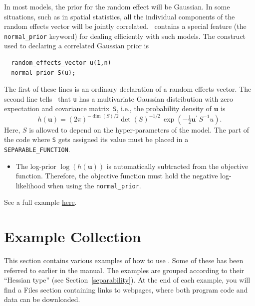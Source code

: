 \documentclass{admbmanual}
\begin{document}
In most models, the prior for the random effect will be Gaussian. In some
situations, such as in spatial statistics, all the individual components of the
random effects vector will be jointly correlated. \scAB\ contains a special
feature (the \texttt{normal\_prior} keyword) for dealing efficiently with such
models. The construct used to declaring a correlated Gaussian prior is
\begin{lstlisting}
  random_effects_vector u(1,n)
  normal_prior S(u);
\end{lstlisting}
The first of these lines is an ordinary declaration of a random effects vector.
The second line tells \scAB\ that \texttt{u} has a multivariate Gaussian
distribution with zero expectation and covariance matrix~\texttt{S}, i.e., the
probability density of $\mathbf{u}$ is
\[
h(\mathbf{u})=\left(2\pi \right)^{-\dim(S)/2}\det (S)^{-1/2}\,
\exp \left(-\tfrac{1}{2}\mathbf{u}^{\prime} \, S^{-1}u\right) .
\]
Here, $S$ is allowed to depend on the hyper-parameters of the model. The part of
the code where \texttt{S} gets assigned its value must be placed in a
\texttt{SEPARABLE\_FUNCTION}.
\begin{itemize}
  \item[$\bigstar$] The log-prior $\log \left(h\left(\mathbf{u}\right) \right)
  $ is automatically subtracted from the objective function. Therefore, the
  objective function must hold the negative log-likelihood when using the
  \texttt{normal\_prior}.
\end{itemize}
See a full example
\href{http://www.admb-project.org/otter-research/admbre/examples/spatial/spatial.html}{here}.

\appendix

\chapter{Example Collection}
\label{sec:example_collection}

This section contains various examples of how to use \scAR. Some of these has
been referred to earlier in the manual. The examples are grouped according to
their ``Hessian type'' (see Section~\ref{separability}). At the end of each
example, you will find a Files section containing links to webpages, where both
program code and data can be downloaded.
\end{document}
